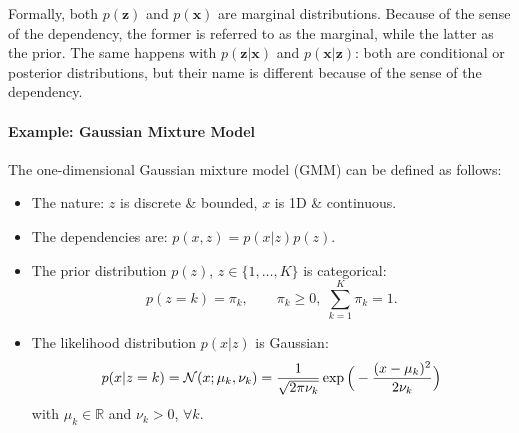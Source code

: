 
Formally, both $p(\mathbf{z})$ and $p(\mathbf{x})$ are marginal distributions. Because of the sense of the dependency, the former is referred to as the marginal, while the latter as the prior. The same happens with $p(\mathbf{z}|\mathbf{x})$ and $p(\mathbf{x}|\mathbf{z})$: both are conditional or posterior distributions, but their name is different because of the sense of the dependency.

\paragraph{Example: Gaussian Mixture Model} The one-dimensional Gaussian mixture model (GMM) can be defined as follows:
\begin{itemize}
\item The nature: $z$ is discrete \& bounded, $x$ is 1D \& continuous.
\item The dependencies are: $p(x,z)=p(x|z)p(z)$.
\item The prior distribution $p(z)$, $z\in\{1,\ldots,K\}$ is categorical:
\begin{equation}p(z=k) = \pi_k, \qquad \pi_k\geq 0,\; \sum_{k=1}^K \pi_k = 1.\end{equation}
\item The likelihood distribution $p(x|z)$ is Gaussian:
\begin{equation}p(x|z=k) = {\cal N}(x;\mu_k,\nu_k) = \frac{1}{\sqrt{2\pi\nu_k}}\exp\Big(-\frac{(x-\mu_k)^2}{2\nu_k}\Big)\end{equation}
with $\mu_k\in\mathbb{R}$ and $\nu_k>0$, $\forall k$.
\end{itemize}


